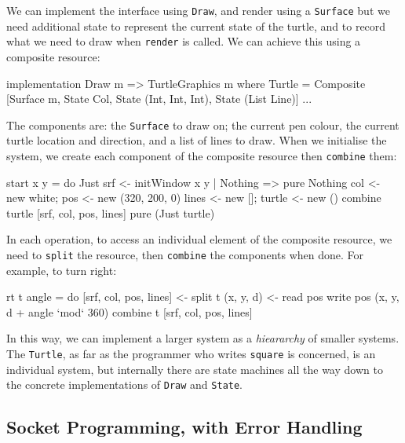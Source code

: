 We can implement the interface using \texttt{Draw}, and render using
a \texttt{Surface} but we need additional state to represent the current
state of the turtle, and to record what we need to draw when \texttt{render}
is called. We can achieve this using a composite resource:

\small
\begin{code}
implementation Draw m => TurtleGraphics m where
  Turtle = Composite [Surface {m}, State Col, State (Int, Int, Int), 
                      State (List Line)] 
  ...
\end{code}
\normalsize

The components are: the \texttt{Surface} to draw on; the current pen colour,
the current turtle location and direction, and a list
of lines to draw. When we initialise the system, we create each component
of the composite resource then \texttt{combine} them:
  
\small
\begin{code}
start x y = do Just srf <- initWindow x y | Nothing => pure Nothing
               col <- new white; pos <- new (320, 200, 0)
               lines <- new []; turtle <- new ()
               combine turtle [srf, col, pos, lines]
               pure (Just turtle)
\end{code}
\normalsize

In each operation, to access an individual element of the composite resource,
we need to \texttt{split} the resource, then \texttt{combine} the components
when done. For example, to turn right:

\small
\begin{code}
rt t angle = do [srf, col, pos, lines] <- split t
                (x, y, d) <- read pos
                write pos (x, y, d + angle `mod` 360)
                combine t [srf, col, pos, lines]
\end{code}
\normalsize

In this way, we can implement a larger system as a \emph{hieararchy} of
smaller systems. The \texttt{Turtle}, as far as the programmer who writes
\texttt{square} is concerned, is an individual system, but internally there
are state machines all the way down to the concrete implementations of
\texttt{Draw} and \texttt{State}.

\subsection{Socket Programming, with Error Handling}

